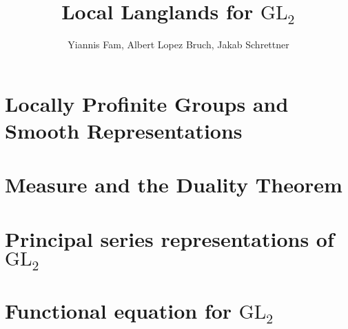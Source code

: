 \documentclass{article}
\title{Local Langlands for $\mathrm{GL}_2$}
\author{Yiannis Fam, Albert Lopez Bruch, Jakab Schrettner}
\newcommand{\GL}{\mathrm{GL}}
\theoremstyle{plain}
\theoremstyle{definition}
\begin{document}
	\maketitle

\section{Locally Profinite Groups and Smooth Representations}

\section{Measure and the Duality Theorem}






\section{Principal series representations of \texorpdfstring{$\GL_2$}{TEXT}}\label{sec:principal}




\section{Functional equation for \texorpdfstring{$\GL_2$}{TEXT}}









%

%




\newpage



\end{document}
